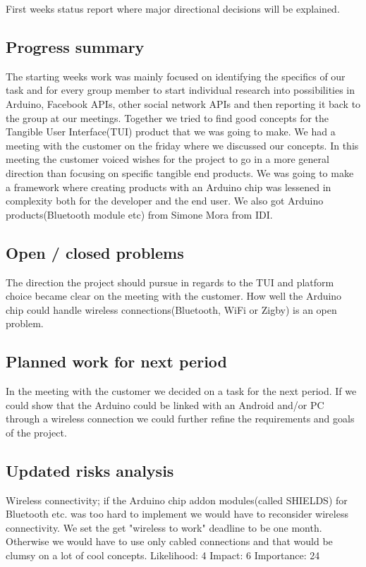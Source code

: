 First weeks status report where major directional decisions will be explained.

\subsection{Progress summary}
The starting weeks work was mainly focused on identifying the specifics of our task and for every group member to start individual research into possibilities in Arduino, Facebook APIs, other social network APIs and then reporting it back to the group at our meetings. Together we tried to find good concepts for the Tangible User Interface(TUI) product that we was going to make. We had a meeting with the customer on the friday where we discussed our concepts. In this meeting the customer voiced wishes for the project to go in a more general direction than focusing on specific tangible end products. We was going to make a framework where creating products with an Arduino chip was lessened in complexity both for the developer and the end user.
We also got Arduino products(Bluetooth module etc) from Simone Mora from IDI.

\subsection{Open / closed problems}
The direction the project should pursue in regards to the TUI and platform choice became clear on  the meeting with the customer.
How well the Arduino chip could handle wireless connections(Bluetooth, WiFi or Zigby) is an open problem.

\subsection{ Planned work for next period}
In the meeting with the customer we decided on a task for the next period. If we could show that the Arduino could be linked with an Android and/or PC through a wireless connection we could further refine the requirements and goals of the project. 

\subsection{Updated risks analysis}
Wireless connectivity; if the Arduino chip addon modules(called SHIELDS) for Bluetooth etc. was too hard to implement we would have to reconsider wireless connectivity. We set the get "wireless to work" deadline to be one month. Otherwise we would have to use only cabled connections and that would be clumsy on a lot of cool concepts.
 Likelihood: 4 Impact: 6 Importance: 24